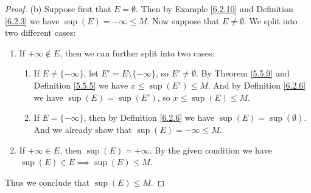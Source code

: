 \begin{proof}{(b)}
    Suppose first that \(E = \emptyset\).
    Then by Example \ref{6.2.10} and Definition \ref{6.2.3} we have \(\sup(E) = -\infty \leq M\).
    Now suppose that \(E \neq \emptyset\).
    We split into two different cases:
    \begin{enumerate}[label=(\Roman*)]
        \item If \(+\infty \not\in E\), then we can further split into two cases:
              \begin{enumerate}[label=(\roman*)]
                  \item If \(E \neq \{-\infty\}\), let \(E' = E \setminus \{-\infty\}\), so \(E' \neq \emptyset\).
                        By Theorem \ref{5.5.9} and Definition \ref{5.5.5} we have \(x \leq \sup(E') \leq M\).
                        And by Definition \ref{6.2.6} we have \(\sup(E) = \sup(E')\), so \(x \leq \sup(E) \leq M\).
                  \item If \(E = \{-\infty\}\), then by Definition \ref{6.2.6} we have \(\sup(E) = \sup(\emptyset)\).
                        And we already show that \(\sup(E) = -\infty \leq M\).
              \end{enumerate}
        \item If \(+\infty \in E\), then \(\sup(E) = +\infty\).
              By the given condition we have \(\sup(E) \in E \implies \sup(E) \leq M\).
    \end{enumerate}
    Thus we conclude that \(\sup(E) \leq M\).
\end{proof}

